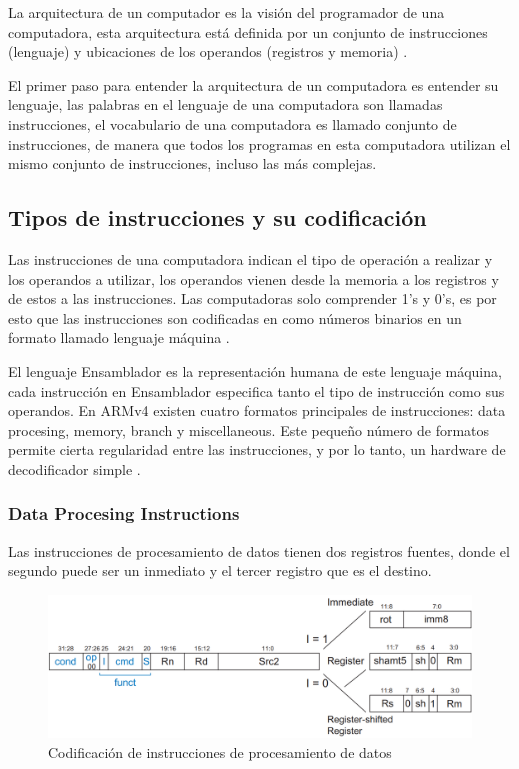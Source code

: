 \documentclass[journal,trans]{IEEEtran}
\begin{document}
	La arquitectura de un computador es la visión del programador de una computadora, esta arquitectura está definida por un conjunto de instrucciones (lenguaje) y ubicaciones de los operandos (registros y memoria) \cite{SarahLHarris2010}. 
	
	El primer paso para entender la arquitectura de un computadora es entender su lenguaje, las palabras en el lenguaje de una computadora son llamadas instrucciones, el vocabulario de una computadora es llamado conjunto de instrucciones, de manera que todos los programas en esta computadora utilizan el mismo conjunto de instrucciones, incluso las más complejas.
	
	\subsection{Tipos de instrucciones y su codificación}
	Las instrucciones de una computadora indican el tipo de operación a realizar y los operandos a utilizar, los operandos vienen desde la memoria a los registros y de estos a las instrucciones. Las computadoras solo comprender 1's y 0's, es por esto que las instrucciones son codificadas en como números binarios en un formato llamado lenguaje máquina \cite{SarahLHarris2010}.
	
	El lenguaje Ensamblador es la representación humana de este lenguaje máquina, cada instrucción en Ensamblador especifica tanto el tipo de instrucción como sus operandos. En ARMv4 existen cuatro formatos principales de instrucciones: data procesing, memory, branch y miscellaneous. Este pequeño número de formatos permite cierta regularidad entre las instrucciones, y por lo tanto, un hardware de decodificador simple \cite{SarahLHarris2010}.
	
	\subsubsection{Data Procesing Instructions}
	Las instrucciones de procesamiento de datos tienen dos registros fuentes, donde el segundo puede ser un inmediato y el tercer registro que es el destino. 
	
	\begin{figure}[htbp]
		\centering
		\includegraphics[width=\linewidth]{img/datapro.png}
		\caption{Codificación de instrucciones de procesamiento de datos \cite{SarahLHarris2010}}
		\label{fig:DataP}
	\end{figure}
\end{document}
